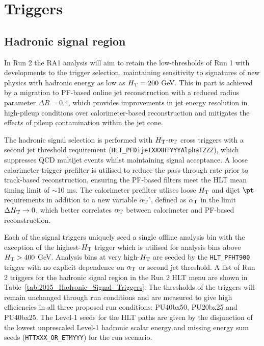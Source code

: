 \section{Triggers}
\label{sec:triggers}


\subsection{Hadronic signal region}


In Run 2 the RA1 analysis will aim to retain the low-thresholds of Run 1 with developments to the trigger selection, maintaining sensitivity to signatures of new physics with hadronic energy as low as $\mbox{$H_\text{T}$} = 200$ GeV. This in part is achieved by a migration to PF-based online jet reconstruction with a reduced radius parameter $\Delta R = 0.4$, which provides improvements in jet energy resolution in high-pileup conditions over calorimeter-based reconstruction and mitigates the effects of pileup contamination within the jet cone.

The hadronic signal selection is performed with $\mbox{$H_\text{T}$}$-$\alpha_{\text{T}}$ cross triggers with a second jet threshold requirement (\verb!HLT_PFDijetXXXHTYYYAlphaTZZZ!), which suppresses QCD multijet events whilst maintaining signal acceptance.  A loose calorimeter trigger prefilter is utilised to reduce the pass-through rate prior to track-based reconstruction, ensuring the PF-based filters meet the HLT mean timing limit of $\sim$10 ms. The calorimeter prefilter utlises loose $\mbox{$H_\text{T}$}$ and dijet $\pt$ requirements in addition to a new variable $\alpha_{\text{T}}$', defined as $\alpha_{\text{T}}$ in the limit $\Delta\mbox{$H_\text{T}$} \rightarrow 0$, which better correlates $\alpha_{\text{T}}$ between calorimeter and PF-based reconstruction.

Each of the signal triggers uniquely seed a single offline analysis bin with the exception of the highest-$\mbox{$H_\text{T}$}$ trigger which is utilised for analysis bins above $\mbox{$H_\text{T}$} > 400$ GeV. Analysis bins at very high-$\mbox{$H_\text{T}$}$ are seeded by the \verb!HLT_PFHT900! trigger with no explicit dependence on $\alpha_{\text{T}}$ or second jet threshold. A list of Run 2 triggers for the hadronic signal region in the Run 2 HLT menu are shown in Table~\ref{tab:2015_Hadronic_Signal_Triggers}. The thresholds of the triggers will remain unchanged through run conditions and are measured to give high efficiencies in all three proposed run conditions: PU40bx50, PU20bx25 and PU40bx25. The Level-1 seeds for the HLT paths are given by the disjunction of the lowest unprescaled Level-1 hadronic scalar energy and missing energy sum seeds (\verb!HTTXXX_OR_ETMYYY!) for the run scenario.

